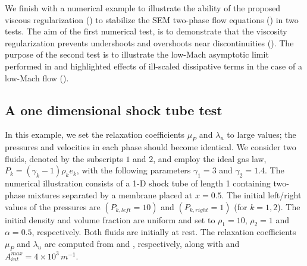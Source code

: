 \documentclass[preprint,10pt]{elsarticle}
\begin{document}

%
We finish with a numerical example to illustrate the ability of the proposed viscous regularization () to stabilize the SEM two-phase flow equations () in two tests.
The aim of the first numerical test, is to demonstrate that the viscosity regularization prevents undershoots and overshoots near discontinuities (). The purpose of the second test is to illustrate the low-Mach asymptotic limit performed in  and highlighted effects of ill-scaled dissipative terms in the case of a low-Mach flow ().
\subsection{A one dimensional shock tube test}\label{sec:first-test}
In this example, we set the relaxation coefficients $\mu_P$ and $\lambda_u$ to large values; the pressures and velocities in each phase should become identical. 
We consider two fluids, denoted by the subscripts $1$ and $2$, and employ the ideal gas law, $P_k=(\gamma_k-1) \rho_k e_k$, with the following parameters $\gamma_1=3$ and $\gamma_2=1.4$. 
The numerical illustration consists of a 1-D shock tube of length 1 containing two-phase mixtures separated by a membrane placed at $x=0.5$. The initial left/right values of the pressures are
 $(P_{k,left}=10)$ and $(P_{k,right}=1)$ (for $k=1,2$). The initial density and volume fraction are uniform and set to $\rho_1=10$, $\rho_2=1$ and $\alpha = 0.5$, respectively. 
Both fluids are initially at rest. The relaxation coefficients $\mu_P$ and $\lambda_u$ are computed from  and , respectively, 
along with  and $A_{int}^{max}=4 \times 10^3\,m^{-1}$.
 
\end{document}
